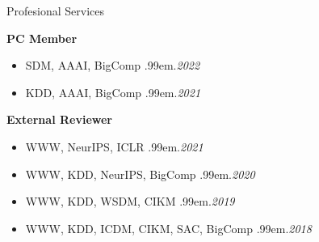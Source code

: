 \documentclass{resume} %
\makeatletter
\newcommand \Dotfill {\leavevmode \cleaders \hb@xt@ .99em{\hss .\hss }\hfill \kern \z@}
\makeatother
\begin{document}
\begin{rSection}{Profesional Services}


\textbf{PC Member}
\begin{itemize}[noitemsep]
	\item SDM, AAAI, BigComp \smallskip \Dotfill \emph{2022}
	\item KDD, AAAI, BigComp \smallskip \Dotfill \emph{2021}
\end{itemize}

\textbf{External Reviewer}
\begin{itemize}[noitemsep]
	\item WWW, NeurIPS, ICLR \smallskip \Dotfill \emph{2021}
	\item WWW, KDD, NeurIPS, BigComp \smallskip \Dotfill \emph{2020}
	\item WWW, KDD, WSDM, CIKM \smallskip \Dotfill \emph{2019}
	\item WWW, KDD, ICDM, CIKM, SAC, BigComp \smallskip \Dotfill \emph{2018}
\end{itemize}

\end{rSection}


\begin{comment}
\begin{rSection}{Experience}

\textbf{Infosys Limited} \hfill Bengaluru, India \\ 
\emph{Student Intern} \hfill \emph{Jun. 2015 - Jul. 2015}

\textbf{SK Hynix} \hfill Incheon, South Korea \\ 
\emph{Student Intern} \hfill \emph{Dec. 2014 - Jan. 2015}

\textbf{KISTI} \hfill Daejeon, South Korea \\ 
\emph{Student Intern} \hfill \emph{Jan. 2014 - Feb. 2014}

\end{rSection}
\end{comment}

\end{document}
